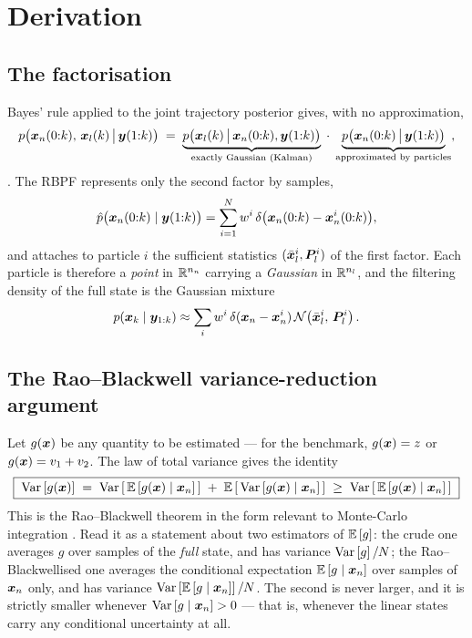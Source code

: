 \section{Derivation}

\subsection{The factorisation}
Bayes' rule applied to the joint trajectory posterior gives, with no approximation,
\begin{equation}
  p\big(\bm{x}_n(0{:}k),\, \bm{x}_l(k) \,\big|\, \bm{y}(1{:}k)\big)
  \;=\;
  \underbrace{p\big(\bm{x}_l(k)\,\big|\,\bm{x}_n(0{:}k),\bm{y}(1{:}k)\big)}_{\text{exactly Gaussian (Kalman)}}
  \;\cdot\;
  \underbrace{p\big(\bm{x}_n(0{:}k)\,\big|\,\bm{y}(1{:}k)\big)}_{\text{approximated by particles}},
  \label{eq:rb-factor}
\end{equation}
\cite[eq.~(6)]{schon2005marginalized}.  The RBPF represents only the second factor by samples,
\begin{equation}
  \hat p\big(\bm{x}_n(0{:}k)\mid\bm{y}(1{:}k)\big) = \sum_{i=1}^{N} w^i\,\delta\big(\bm{x}_n(0{:}k) - \bm{x}_n^i(0{:}k)\big),
  \label{eq:rb-particles}
\end{equation}
and attaches to particle $i$ the sufficient statistics $(\bar{\bm{x}}_l^i, \bm{P}_l^i)$ of the first
factor.  Each particle is therefore a \emph{point} in $\mathbb{R}^{n_n}$ carrying a \emph{Gaussian} in
$\mathbb{R}^{n_l}$, and the filtering density of the full state is the Gaussian mixture
\begin{equation}
  p(\bm{x}_k\mid\bm{y}_{1:k}) \approx \sum_i w^i\, \delta(\bm{x}_n - \bm{x}_n^i)\, \mathcal{N}\!\left(\bar{\bm{x}}_l^i,\,\bm{P}_l^i\right).
  \label{eq:rb-mixture}
\end{equation}

\subsection{The Rao--Blackwell variance-reduction argument}
Let $g(\bm{x})$ be any quantity to be estimated --- for the benchmark, $g(\bm{x}) = z$ or
$g(\bm{x}) = v_1 + v_2$.  The law of total variance gives the identity
\begin{equation}
  \boxed{\;
  \operatorname{Var}\left[g(\bm{x})\right] \;=\; \operatorname{Var}\left[\,\mathbb{E}\left[g(\bm{x})\mid\bm{x}_n\right]\,\right] \;+\; \mathbb{E}\left[\,\operatorname{Var}\left[g(\bm{x})\mid\bm{x}_n\right]\,\right]
  \;\ge\; \operatorname{Var}\left[\,\mathbb{E}\left[g(\bm{x})\mid\bm{x}_n\right]\,\right]\;}
  \label{eq:rb-total-variance}
\end{equation}
This is the Rao--Blackwell theorem in the form relevant to Monte-Carlo integration
\cite{casella1996rao}.  Read it as a statement about two estimators of $\mathbb{E}\left[g\right]$: the crude one
averages $g$ over samples of the \emph{full} state, and has variance $\operatorname{Var}\left[g\right]/N$; the
Rao--Blackwellised one averages the conditional expectation $\mathbb{E}\left[g\mid\bm{x}_n\right]$ over samples of
$\bm{x}_n$ only, and has variance $\operatorname{Var}\left[\mathbb{E}\left[g\mid\bm{x}_n\right]\right]/N$.  The second is never larger, and it is
strictly smaller whenever $\operatorname{Var}\left[g\mid\bm{x}_n\right] > 0$ --- that is, whenever the linear states carry any
conditional uncertainty at all.

